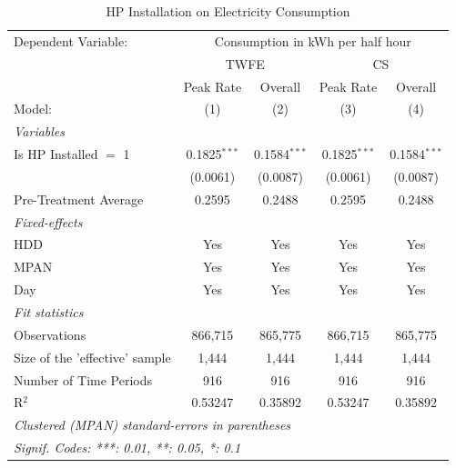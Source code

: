 
\begin{table}[htbp]
   \caption{\label{tab:hp-did} HP Installation on Electricity Consumption}
   \centering
   \begin{tabular}{lcccc}
      \tabularnewline \midrule \midrule
      Dependent Variable: & \multicolumn{4}{c}{Consumption in kWh per half hour}\\
       & \multicolumn{2}{c}{TWFE} & \multicolumn{2}{c}{CS} \\ 
                                     & Peak Rate      & Overall        & Peak Rate      & Overall \\   
      Model:                         & (1)            & (2)            & (3)            & (4)\\  
      \midrule
      \emph{Variables}\\
      Is HP Installed $=$ 1          & 0.1825$^{***}$ & 0.1584$^{***}$ & 0.1825$^{***}$ & 0.1584$^{***}$\\   
                                     & (0.0061)       & (0.0087)       & (0.0061)       & (0.0087)\\   
      \midrule
      Pre-Treatment Average          & 0.2595         & 0.2488         & 0.2595         & 0.2488\\  
\midrule
      \emph{Fixed-effects}\\
      HDD                            & Yes            & Yes            & Yes            & Yes\\  
      MPAN                           & Yes            & Yes            & Yes            & Yes\\  
      Day                            & Yes            & Yes            & Yes            & Yes\\  
      \midrule
      \emph{Fit statistics}\\
      Observations                   & 866,715        & 865,775        & 866,715        & 865,775\\  
      Size of the 'effective' sample & 1,444          & 1,444          & 1,444          & 1,444\\  
      Number of Time Periods         & 916            & 916            & 916            & 916\\  
      R$^2$                          & 0.53247        & 0.35892        & 0.53247        & 0.35892\\  
      \midrule \midrule
      \multicolumn{5}{l}{\emph{Clustered (MPAN) standard-errors in parentheses}}\\
      \multicolumn{5}{l}{\emph{Signif. Codes: ***: 0.01, **: 0.05, *: 0.1}}\\
   \end{tabular}
\end{table}


